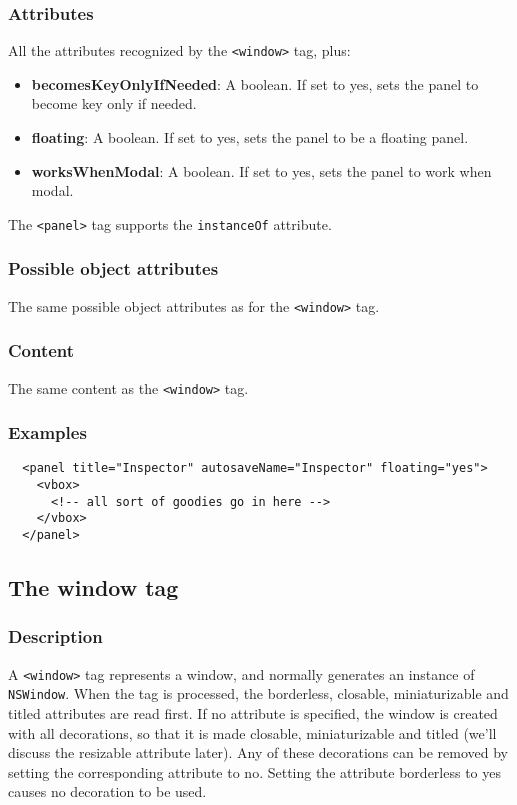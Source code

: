 \subsubsection{Attributes}
All the attributes recognized by the \texttt{<window>} tag, plus:
\begin{itemize}
\item {\bf becomesKeyOnlyIfNeeded}: A boolean.  If set to yes, sets the panel
to become key only if needed.
\item {\bf floating}: A boolean.  If set to yes, sets the panel
to be a floating panel.
\item {\bf worksWhenModal}: A boolean.  If set to yes, sets the panel
to work when modal.
\end{itemize}

The \texttt{<panel>} tag supports the \texttt{instanceOf} attribute.

\subsubsection{Possible object attributes}
The same possible object attributes as for the \texttt{<window>} tag.

\subsubsection{Content}
The same content as the \texttt{<window>} tag.

\subsubsection{Examples}
\begin{verbatim}
  <panel title="Inspector" autosaveName="Inspector" floating="yes">
    <vbox>
      <!-- all sort of goodies go in here -->
    </vbox>
  </panel>
\end{verbatim}

\subsection{The window tag}
\subsubsection{Description}
A \texttt{<window>} tag represents a window, and normally generates an
instance of \texttt{NSWindow}.  When the tag is processed, the
borderless, closable, miniaturizable and titled attributes are read
first.  If no attribute is specified, the window is created with all
decorations, so that it is made closable, miniaturizable and titled
(we'll discuss the resizable attribute later).  Any of these
decorations can be removed by setting the corresponding attribute to
no.  Setting the attribute borderless to yes causes no decoration to
be used.

